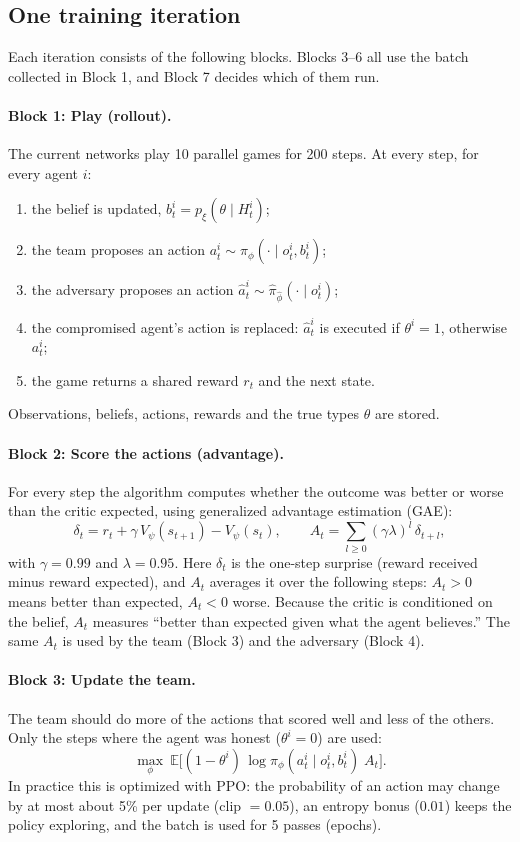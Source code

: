 \documentclass[11pt]{article}
\newcommand{\E}{\mathbb{E}}
\begin{document}
\subsection{One training iteration}
Each iteration consists of the following blocks. Blocks 3--6 all use the batch collected
in Block 1, and Block 7 decides which of them run.

\paragraph{Block 1: Play (rollout).}
The current networks play 10 parallel games for 200 steps. At every step, for every agent
$i$:
\begin{enumerate}[nosep]
  \item the belief is updated, $b^i_t = p_\xi(\theta \mid H^i_t)$;
  \item the team proposes an action $a^i_t \sim \pi_\phi(\cdot \mid o^i_t, b^i_t)$;
  \item the adversary proposes an action $\hat a^i_t \sim \hat\pi_{\hat\phi}(\cdot \mid o^i_t)$;
  \item the compromised agent's action is replaced: $\hat a^i_t$ is executed if
        $\theta^i = 1$, otherwise $a^i_t$;
  \item the game returns a shared reward $r_t$ and the next state.
\end{enumerate}
Observations, beliefs, actions, rewards and the true types $\theta$ are stored.

\paragraph{Block 2: Score the actions (advantage).}
For every step the algorithm computes whether the outcome was better or worse than the
critic expected, using generalized advantage estimation (GAE):
\[
  \delta_t = r_t + \gamma\, V_\psi(s_{t+1}) - V_\psi(s_t),
  \qquad
  A_t = \sum_{l \ge 0} (\gamma\lambda)^l\, \delta_{t+l},
\]
with $\gamma = 0.99$ and $\lambda = 0.95$. Here $\delta_t$ is the one-step surprise
(reward received minus reward expected), and $A_t$ averages it over the following steps:
$A_t > 0$ means better than expected, $A_t < 0$ worse. Because the critic is conditioned on
the belief, $A_t$ measures ``better than expected given what the agent believes.'' The same
$A_t$ is used by the team (Block 3) and the adversary (Block 4).

\paragraph{Block 3: Update the team.}
The team should do more of the actions that scored well and less of the others. Only the
steps where the agent was honest ($\theta^i = 0$) are used:
\[
  \max_\phi \ \E\big[(1-\theta^i)\,\log \pi_\phi(a^i_t \mid o^i_t, b^i_t)\; A_t\big].
\]
In practice this is optimized with PPO: the probability of an action may change by at most
about 5\% per update (clip $=0.05$), an entropy bonus ($0.01$) keeps the policy exploring,
and the batch is used for 5 passes (epochs).
\end{document}
